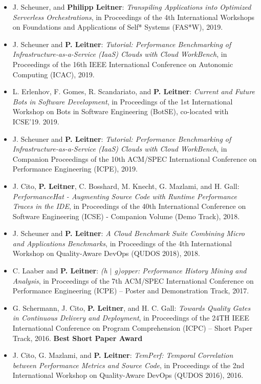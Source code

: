\documentclass[paper=letter,fontsize=11pt]{scrartcl} %
\begin{document}
\begin{itemize}
	\item J. Scheuner, and \textbf{Philipp Leitner}:
\emph{Transpiling Applications into Optimized Serverless Orchestrations}, in Proceedings of the 4th International Workshops on Foundations and Applications of Self* Systems (FAS*W), 2019.
	\item J. Scheuner and \textbf{P. Leitner}: \emph{Tutorial: Performance Benchmarking of Infrastructure-as-a-Service (IaaS) Clouds with Cloud WorkBench}, in Proceedings of the 16th IEEE International Conference on Autonomic Computing (ICAC), 2019.
	\item L. Erlenhov, F. Gomes, R. Scandariato, and \textbf{P. Leitner}: \emph{Current and Future Bots in Software Development}, in Proceedings of the 1st International Workshop on
Bots in Software Engineering (BotSE), co-located with ICSE'19. 2019.
	\item J. Scheuner and \textbf{P. Leitner}: \emph{Tutorial: Performance Benchmarking of Infrastructure-as-a-Service (IaaS) Clouds with Cloud WorkBench}, in Companion Proceedings of the 10th ACM/SPEC International Conference on Performance Engineering (ICPE), 2019.
	\item J. Cito, \textbf{P. Leitner}, C. Bosshard, M. Knecht, G. Mazlami, and H. Gall: \emph{PerformanceHat - Augmenting Source Code with Runtime Performance Traces in the IDE}, in Proceedings of the 40th International Conference on Software Engineering (ICSE) - Companion Volume (Demo Track), 2018.
	\item J. Scheuner and \textbf{P. Leitner}: \emph{A Cloud Benchmark Suite Combining Micro and Applications Benchmarks}, in Proceedings of the 4th International Workshop on Quality-Aware DevOps (QUDOS 2018), 2018.
	\item C. Laaber and \textbf{P. Leitner}: \emph{ (h $|$ g)opper: Performance History Mining and Analysis},  in Proceedings of the 7th ACM/SPEC International Conference on Performance Engineering (ICPE) -- Poster and Demonstration Track, 2017.
	\item G. Schermann, J. Cito, \textbf{P. Leitner}, and H. C. Gall: \emph{Towards Quality Gates in Continuous Delivery and Deployment}, in Proceedings of the 24TH IEEE International Conference on Program Comprehension (ICPC) – Short Paper Track, 2016. \textbf{Best Short Paper Award}
	\item J. Cito, G. Mazlami, and \textbf{P. Leitner}: \emph{TemPerf: Temporal Correlation between Performance Metrics and Source Code}, in Proceedings of the 2nd International Workshop on Quality-Aware DevOps (QUDOS 2016), 2016.

\end{itemize}
\end{document}

